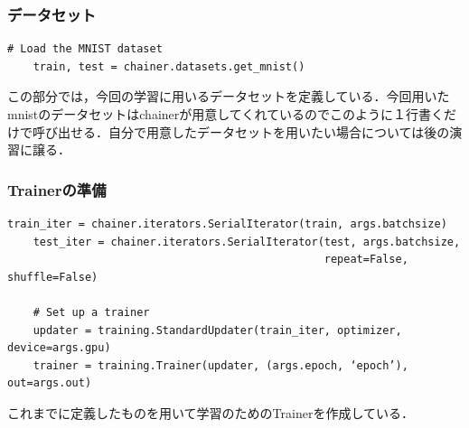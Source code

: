 \subsubsection{データセット}
\begin{lstlisting}[basicstyle=\ttfamily\footnotesize, frame=single]
   # Load the MNIST dataset
    train, test = chainer.datasets.get_mnist()
\end{lstlisting}
この部分では，今回の学習に用いるデータセットを定義している．今回用いたmnistのデータセットはchainerが用意してくれているのでこのように１行書くだけで呼び出せる．自分で用意したデータセットを用いたい場合については後の演習に譲る．
 
 \subsubsection{Trainerの準備}
\begin{lstlisting}[basicstyle=\ttfamily\footnotesize, frame=single]
    train_iter = chainer.iterators.SerialIterator(train, args.batchsize)
    test_iter = chainer.iterators.SerialIterator(test, args.batchsize,
                                                 repeat=False, shuffle=False)

    # Set up a trainer
    updater = training.StandardUpdater(train_iter, optimizer, device=args.gpu)
    trainer = training.Trainer(updater, (args.epoch, ‘epoch’), out=args.out)
\end{lstlisting}
 これまでに定義したものを用いて学習のためのTrainerを作成している．
